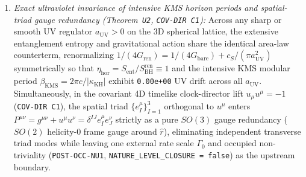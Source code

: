\documentclass[11pt]{article}
\begin{document}
\begin{enumerate}
\begin{equation}
  \mathrm{d}K = -r(2H^2+\dot{H})\,\mathrm{d}t\wedge\mathrm{d}r,
  \label{eq:paperv-f2-kodama-exterior}
\end{equation}
whose contraction on the apparent horizon $r_{\mathrm{AH}}=c/H(z)$ uniquely fixes the Kodama--Hayward surface gravity and half-period acceleration scale
\begin{equation}
  |\kappa_{\mathrm{KH}}(z)| = cH(z)\left|1-\frac{3}{4}\Omega_m(z)\right|,
  \quad
  a_0(z) = \frac{\alpha_{\mathrm{OCSR}}}{2}|\kappa_{\mathrm{KH}}(z)|
  = \frac{5\sqrt{3}}{48}\,cH(z)\left|1-\frac{3}{4}\Omega_m(z)\right|,
  \label{eq:paperv-f2-kh-scale}
\end{equation}
with $\alpha_{\mathrm{OCSR}}=\operatorname{Tr}((I_4-H_b(1/4))_+)=5\sqrt{3}/24$ and $a_0(0)=1.1808\times 10^{-10}\;\mathrm{m/s^2}$ at Planck $H_0=67.36\;\mathrm{km\,s^{-1}\,Mpc^{-1}}$. By contrast, replacing $2H^2+\dot{H}$ by the kinematic deceleration factor $H^2+\dot{H}$ violates $\mathrm{d}(\omega_{\mathrm{kin}})\neq 0$ whenever $\dot{H}\neq 0$ and is independently rejected on high-$z$ disks ($p=0.0195$). For a finite-core baryon profile $\Sigma_{\mathrm{bar}}(0)<\infty$, radial Stokes integration on the horizon-spanning disk gives a strictly bounded holonomy ratio $q_{\mathrm{hol}}(R)\to 1$ as $R\to 0^+$ with zero logarithmic UV divergence.
\item \emph{Exact ultraviolet invariance of intensive KMS horizon periods and spatial-triad gauge redundancy (Theorem~\texttt{U2}, \texttt{COV-DIR C1}):} Across any sharp or smooth UV regulator $a_{\mathrm{UV}}>0$ on the 3D spherical lattice, the extensive entanglement entropy and gravitational action share the identical area-law counterterm, renormalizing $1/(4G_{\mathrm{ren}})=1/(4G_{\mathrm{bare}})+c_S/(\pi a_{\mathrm{UV}}^2)$ symmetrically so that $\eta_{\mathrm{hor}}=S_{\mathrm{ent}}/S_{\mathrm{BH}}^{\mathrm{ren}}\equiv 1$ and the intensive KMS modular period $\beta_{\mathrm{KMS}}=2\pi c/|\kappa_{\mathrm{KH}}|$ exhibit \texttt{0.00e+00} UV drift across all $a_{\mathrm{UV}}$. Simultaneously, in the covariant 4D timelike clock-director lift $u_\mu u^\mu=-1$ (\texttt{COV-DIR C1}), the spatial triad $\{e_I^\mu\}_{I=1}^3$ orthogonal to $u^\mu$ enters $P^{\mu\nu}=g^{\mu\nu}+u^\mu u^\nu=\delta^{IJ}e_I^\mu e_J^\nu$ strictly as a pure $SO(3)$ gauge redundancy ($SO(2)$ helicity-0 frame gauge around $\hat{r}$), eliminating independent transverse triad modes while leaving one external rate scale $\Gamma_0$ and occupied non-triviality (\texttt{POST-OCC-NU1}, \texttt{NATURE\_LEVEL\_CLOSURE = false}) as the upstream boundary.
\end{enumerate}
\end{document}
